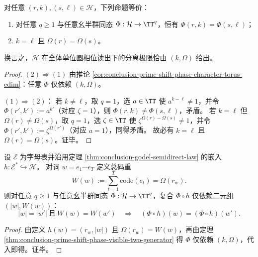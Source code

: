 \begin{proposition}[相位不可辨识关系的完全刻画]\label{prop:conclusion-prime-shift-phase-indistinguishability}
对任意 \((r,k),(s,\ell)\in\mathcal H\)，下列命题等价：
\begin{enumerate}
  \item 对任意 \(q\ge 1\) 与任意幺半群同态 \(\Phi:\mathcal H\to\TT^q\)，恒有 \(\Phi(r,k)=\Phi(s,\ell)\)；
  \item \(k=\ell\) 且 \(\Omega(r)=\Omega(s)\)。
\end{enumerate}
换言之，\(\mathcal H\) 在全体单位圆相位读出下的分离极限恰由 \((k,\Omega)\) 给出。
\end{proposition}
\begin{proof}
\((2)\Rightarrow(1)\) 由推论 \ref{cor:conclusion-prime-shift-phase-character-torus-cdim}：任意 \(\Phi\) 仅依赖 \((k,\Omega)\)。
\par
\((1)\Rightarrow(2)\)：
若 \(k\neq \ell\)，取 \(q=1\)，选 \(a\in\TT\) 使 \(a^{k-\ell}\neq 1\)，并令 \(\Phi(r',k'):=a^{k'}\)（对应 \(\zeta=1\)），则 \(\Phi(r,k)\neq \Phi(s,\ell)\)，矛盾。
若 \(k=\ell\) 但 \(\Omega(r)\neq \Omega(s)\)，取 \(q=1\)，选 \(\zeta\in\TT\) 使 \(\zeta^{\Omega(r)-\Omega(s)}\neq 1\)，并令 \(\Phi(r',k'):=\zeta^{\Omega(r')}\)（对应 \(a=1\)），同得矛盾。
故必有 \(k=\ell\) 且 \(\Omega(r)=\Omega(s)\)。证毕。
\end{proof}

\begin{corollary}\label{cor:conclusion-godel-phase-collapse-length-weight}
设 \(\mathcal E\) 为字母表并沿用定理 \ref{thm:conclusion-godel-semidirect-law} 的嵌入 \(h:\mathcal E^\ast\hookrightarrow\mathcal H\)。
对词 \(w=e_1\cdots e_T\) 定义总码重
\[
W(w):=\sum_{t=1}^{T}\mathrm{code}(e_t)=\Omega(r_w).
\]
则对任意 \(q\ge 1\) 与任意幺半群同态 \(\Phi:\mathcal H\to\TT^q\)，复合 \(\Phi\circ h\) 仅依赖二元组 \((|w|,W(w))\)：
\[
|w|=|w'|\ \text{且}\ W(w)=W(w')
\quad\Longrightarrow\quad
(\Phi\circ h)(w)=(\Phi\circ h)(w').
\]
\end{corollary}
\begin{proof}
由定义 \(h(w)=(r_w,|w|)\) 且 \(\Omega(r_w)=W(w)\)，再由定理 \ref{thm:conclusion-prime-shift-phase-visible-two-generator} 得 \(\Phi\) 仅依赖 \((k,\Omega)\)，代入即得。证毕。
\end{proof}

